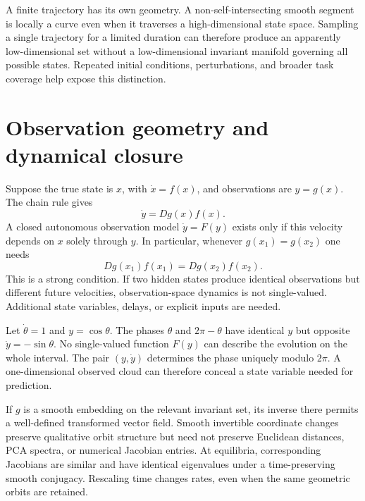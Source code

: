 A finite trajectory has its own geometry. A non-self-intersecting smooth segment is locally a curve even when it traverses a high-dimensional state space. Sampling a single trajectory for a limited duration can therefore produce an apparently low-dimensional set without a low-dimensional invariant manifold governing all possible states. Repeated initial conditions, perturbations, and broader task coverage help expose this distinction.

\section{Observation geometry and dynamical closure}
Suppose the true state is $x$, with $\dot x=f(x)$, and observations are $y=g(x)$. The chain rule gives
\begin{equation}\label{eq:observation-velocity}
\dot y=Dg(x)f(x).
\end{equation}
A closed autonomous observation model $\dot y=F(y)$ exists only if this velocity depends on $x$ solely through $y$. In particular, whenever $g(x_1)=g(x_2)$ one needs
\begin{equation}\label{eq:closure-condition}
Dg(x_1)f(x_1)=Dg(x_2)f(x_2).
\end{equation}
This is a strong condition. If two hidden states produce identical observations but different future velocities, observation-space dynamics is not single-valued. Additional state variables, delays, or explicit inputs are needed.

\begin{example}
Let $\dot\theta=1$ and $y=\cos\theta$. The phases $\theta$ and $2\pi-\theta$ have identical $y$ but opposite $\dot y=-\sin\theta$. No single-valued function $F(y)$ can describe the evolution on the whole interval. The pair $(y,\dot y)$ determines the phase uniquely modulo $2\pi$. A one-dimensional observed cloud can therefore conceal a state variable needed for prediction.
\end{example}

If $g$ is a smooth embedding on the relevant invariant set, its inverse there permits a well-defined transformed vector field. Smooth invertible coordinate changes preserve qualitative orbit structure but need not preserve Euclidean distances, PCA spectra, or numerical Jacobian entries. At equilibria, corresponding Jacobians are similar and have identical eigenvalues under a time-preserving smooth conjugacy. Rescaling time changes rates, even when the same geometric orbits are retained.

